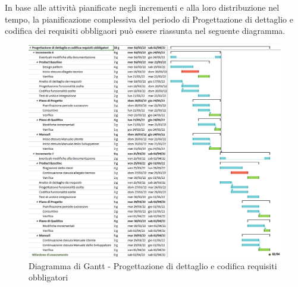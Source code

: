 \pagebreak
In base alle attività pianificate negli incrementi e alla loro distribuzione nel tempo, la pianificazione complessiva del periodo di Progettazione di dettaglio e codifica dei requisiti obbligaori può essere riassunta nel seguente diagramma.
\begin{figure}[H]
  \centering
  \includegraphics[scale=0.52]{immagini/prog_requisiti_obbligatori.png}
  \caption{Diagramma di Gantt - Progettazione di dettaglio e codifica requisiti obbligatori}
\end{figure}
\pagebreak


